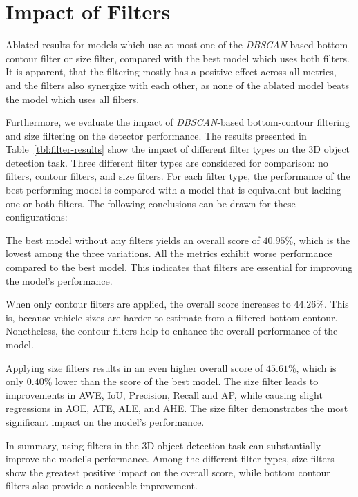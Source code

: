 
\section{Impact of Filters}
\label{sec:impactcontourfiltering}

\begin{table}[htbp]
    
    \caption{Ablated results for models which use at most one of the \textit{DBSCAN}-based bottom contour filter or size filter, compared with the best model which uses both filters. It is apparent, that the filtering mostly has a positive effect across all metrics, and the filters also synergize with each other, as none of the ablated model beats the model which uses all filters.}
    \label{tbl:filter-results}
\end{table}

Furthermore, we evaluate the impact of \textit{DBSCAN}-based bottom-contour filtering and size filtering on the detector performance.
The results presented in Table~\ref{tbl:filter-results} show the impact of different filter types on the 3D object detection task.
Three different filter types are considered for comparison: no filters, contour filters, and size filters.
For each filter type, the performance of the best-performing model is compared with a model that is equivalent but lacking one or both filters.
The following conclusions can be drawn for these configurations:

The best model without any filters yields an overall score of $40.95\%$, which is the lowest among the three variations.
All the metrics exhibit worse performance compared to the best model.
This indicates that filters are essential for improving the model's performance.

When only contour filters are applied, the overall score increases to $44.26\%$.
This is, because vehicle sizes are harder to estimate from a filtered bottom contour.
Nonetheless, the contour filters help to enhance the overall performance of the model.

Applying size filters results in an even higher overall score of $45.61\%$, which is only $0.40\%$ lower than the score of the best model.
The size filter leads to improvements in AWE, IoU, Precision, Recall and AP, while causing slight regressions in AOE, ATE, ALE, and AHE.
The size filter demonstrates the most significant impact on the model's performance.

In summary, using filters in the 3D object detection task can substantially improve the model's performance.
Among the different filter types, size filters show the greatest positive impact on the overall score, while bottom contour filters also provide a noticeable improvement.

